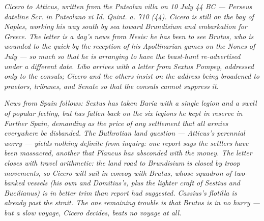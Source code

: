 
\textit{Cicero to Atticus, written from the Puteolan villa on
10 July 44 BC --- Perseus dateline \textit{Scr. in Puteolano
vi Id. Quint. a. 710 (44)}. Cicero is still on the bay of
Naples, working his way south by sea toward Brundisium and
embarkation for Greece. The letter is a day's news from
Nesis: he has been to see Brutus, who is wounded to the quick
by the reception of his Apollinarian games on the Nones of
July --- so much so that he is arranging to have the
beast-hunt re-advertised under a different date. Libo arrives
with a letter from Sextus Pompey, addressed only to the
consuls; Cicero and the others insist on the address being
broadened to praetors, tribunes, and Senate so that the
consuls cannot suppress it.}

\textit{News from Spain follows: Sextus has taken Baria with
a single legion and a swell of popular feeling, but has
fallen back on the six legions he kept in reserve in Further
Spain, demanding as the price of any settlement that all
armies everywhere be disbanded. The Buthrotian land
question --- Atticus's perennial worry --- yields nothing
definite from inquiry: one report says the settlers have been
massacred, another that Plancus has absconded with the money.
The letter closes with travel arithmetic: the land road to
Brundisium is closed by troop movements, so Cicero will sail
in convoy with Brutus, whose squadron of two-banked vessels
(his own and Domitius's, plus the lighter craft of Sestius
and Bucilianus) is in better trim than report had suggested.
Cassius's flotilla is already past the strait. The one
remaining trouble is that Brutus is in no hurry --- but a
slow voyage, Cicero decides, beats no voyage at all.}
